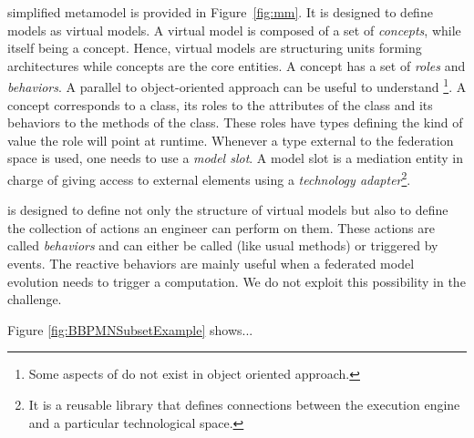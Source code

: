 \FML simplified metamodel is provided in Figure~\ref{fig:mm}. It is designed to define models as virtual models. A virtual model
is composed of a set of \emph{concepts}, while itself being a concept.
Hence, virtual models are structuring units forming architectures while concepts are the
core entities. A concept has a set of \emph{roles} and
\emph{behaviors}. A parallel to object-oriented approach can be useful
to understand \FML\footnote{Some aspects of \FML do not exist in object oriented approach.}. A concept corresponds to a class, its roles to the
attributes of the class and its behaviors to the methods of the class.
These roles have types defining the kind of value the role will point
at runtime.
Whenever a type external to the federation space is used, one needs to use a \emph{model slot}. A model
slot is a mediation entity in charge of giving
access to external elements using
a \emph{technology adapter}\footnote{It is a reusable library that defines
connections between the \FML execution engine and a particular
technological space.}.

\FML is designed to define not only the structure of virtual models but
also to define the collection of actions an engineer can perform on
them. These actions are called \emph{behaviors} and can either be called (like usual methods) or triggered by events. The reactive behaviors are mainly useful when a federated model evolution needs to trigger a computation. We do not
exploit this possibility in the challenge.



Figure \ref{fig:BBPMNSubsetExample} shows...

